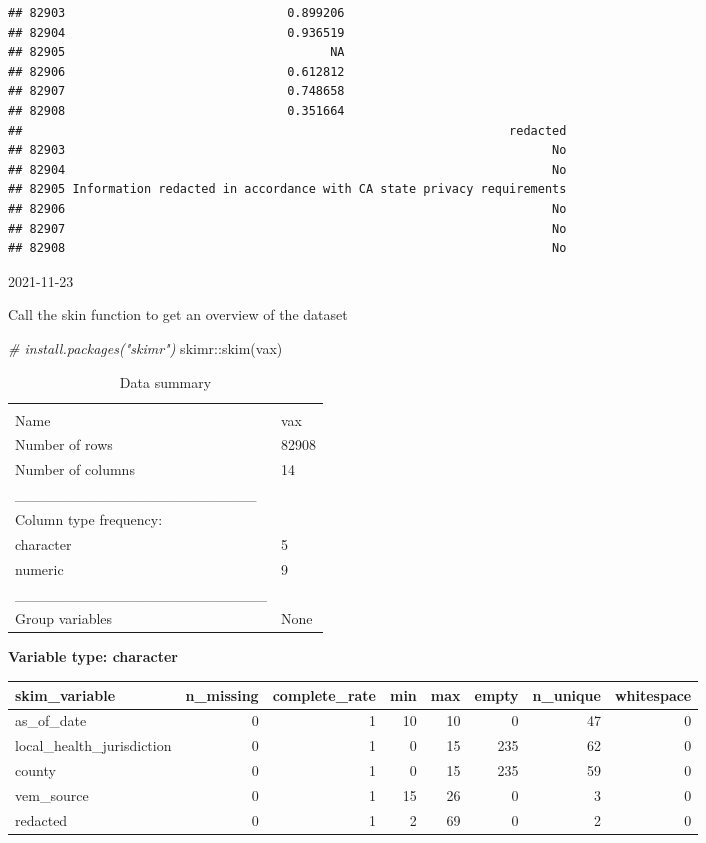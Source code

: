 \documentclass[
]{article}
\newenvironment{Shaded}{\begin{snugshade}}{\end{snugshade}}
\newcommand{\CommentTok}[1]{\textcolor[rgb]{0.56,0.35,0.01}{\textit{#1}}}
\newcommand{\FunctionTok}[1]{\textcolor[rgb]{0.00,0.00,0.00}{#1}}
\newcommand{\NormalTok}[1]{#1}
\newcommand{\SpecialCharTok}[1]{\textcolor[rgb]{0.00,0.00,0.00}{#1}}
\begin{document}
\begin{verbatim}
## 82903                               0.899206
## 82904                               0.936519
## 82905                                     NA
## 82906                               0.612812
## 82907                               0.748658
## 82908                               0.351664
##                                                                    redacted
## 82903                                                                    No
## 82904                                                                    No
## 82905 Information redacted in accordance with CA state privacy requirements
## 82906                                                                    No
## 82907                                                                    No
## 82908                                                                    No
\end{verbatim}

2021-11-23

Call the skin function to get an overview of the dataset

\begin{Shaded}
\begin{Highlighting}[]
\CommentTok{\# install.packages("skimr")}
\NormalTok{skimr}\SpecialCharTok{::}\FunctionTok{skim}\NormalTok{(vax)}
\end{Highlighting}
\end{Shaded}

\begin{longtable}[]{@{}ll@{}}
\caption{Data summary}\tabularnewline
\toprule
& \\
\midrule
\endfirsthead
\toprule
& \\
\midrule
\endhead
Name & vax \\
Number of rows & 82908 \\
Number of columns & 14 \\
\_\_\_\_\_\_\_\_\_\_\_\_\_\_\_\_\_\_\_\_\_\_\_ & \\
Column type frequency: & \\
character & 5 \\
numeric & 9 \\
\_\_\_\_\_\_\_\_\_\_\_\_\_\_\_\_\_\_\_\_\_\_\_\_ & \\
Group variables & None \\
\bottomrule
\end{longtable}

\textbf{Variable type: character}

\begin{longtable}[]{@{}lrrrrrrr@{}}
\toprule
skim\_variable & n\_missing & complete\_rate & min & max & empty &
n\_unique & whitespace \\
\midrule
\endhead
as\_of\_date & 0 & 1 & 10 & 10 & 0 & 47 & 0 \\
local\_health\_jurisdiction & 0 & 1 & 0 & 15 & 235 & 62 & 0 \\
county & 0 & 1 & 0 & 15 & 235 & 59 & 0 \\
vem\_source & 0 & 1 & 15 & 26 & 0 & 3 & 0 \\
redacted & 0 & 1 & 2 & 69 & 0 & 2 & 0 \\
\bottomrule
\end{longtable}
\end{document}
